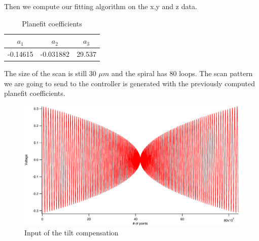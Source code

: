 Then we compute our fitting algorithm on the x,y and z data.
\begin{table}[H]
\caption{Planefit coefficients} %
\centering %
\begin{tabular}{c c c} %
\hline\hline %
$a_1$ & $a_2$ & $a_3$ \\ [0.5ex] %
\hline %
-0.14615  & -0.031882 & 29.537 \\[1ex]

\hline %
\end{tabular}
\label{table:planefit} %
\end{table}

The size of the scan is still 30 $\mu m$ and the spiral has 80 loops. The scan pattern we are going to send to the controller is generated with the previously computed planefit coefficients. 

\begin{figure}[H]
  \centering
  \includegraphics[scale=0.4]{images/spiralztiltout.eps}
    \caption{Input of the tilt compensation}
  \label{spiralztiltout}
\end{figure}

